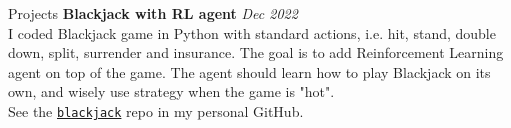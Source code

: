 \documentclass{resume} %
\begin{document}
\begin{rSection}{Projects}
{\bf Blackjack with RL agent} \hfill {\em Dec 2022}\\
I coded Blackjack game in Python with standard actions, i.e. hit, stand, double down, split, surrender and insurance. The goal is to add Reinforcement Learning agent on top of the game. The agent should learn how to play Blackjack on its own, and wisely use strategy when the game is "hot".\\
See the \href{https://github.com/samuelpucek/blackjack}{\texttt{blackjack}} repo in my personal GitHub.

\end{rSection}
\end{document}
